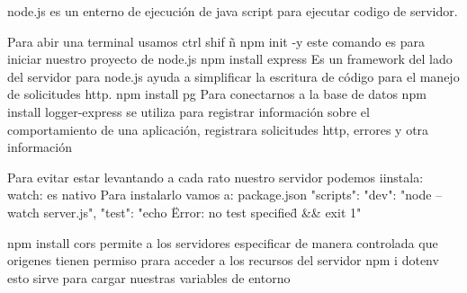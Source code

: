     node.js
        es un enterno de ejecución de java script para ejecutar codigo de servidor.


    Para abir una terminal usamos ctrl shif ñ 
npm init -y
     este comando es para iniciar nuestro proyecto de node.js 
npm install express
    Es un framework del lado del servidor para node.js ayuda a simplificar la escritura de código para el manejo de solicitudes http.
npm install pg
    Para conectarnos a la base de datos
npm install logger-express
    se utiliza para registrar información sobre el comportamiento de una aplicación, registrara solicitudes http, errores y otra información

Para evitar estar levantando a cada rato nuestro servidor podemos iinstala:
    watch: es nativo
         Para instalarlo vamos a:
            package.json
                "scripts": 
                    "dev": "node --watch server.js",
                    "test": "echo \"Error: no test specified\" && exit 1"

npm install cors
    permite a los servidores especificar de manera controlada que origenes tienen permiso prara acceder a los recursos del servidor
npm i dotenv
    esto sirve para cargar nuestras variables de entorno

